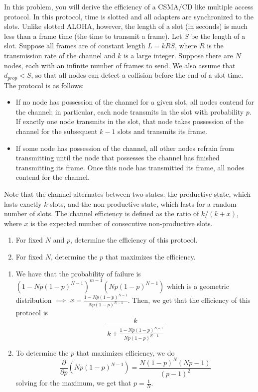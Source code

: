 \documentclass{report}
\begin{document}
\newpage
\begin{problem}
In this problem, you will derive the efficiency of a CSMA/CD like multiple access protocol.
In this protocol, time is slotted and all adapters are synchronized to the slots.
Unlike slotted ALOHA, however, the length of a slot (in seconds) is much less than a frame time (the time to transmit a frame).
Let $S$ be the length of a slot.
Suppose all frames are of constant length $L = kRS$, where $R$ is the transmission rate of the channel and $k$ is a large integer.
Suppose there are $N$ nodes, each with an infinite number of frames to send.
We also assume that $d_{prop} < S$, so that all nodes can detect a collision before the end of a slot time.
The protocol is as follows:

\begin{itemize}
\item If no node has possession of the channel for a given slot, all nodes contend for the channel; in particular, each node transmits in the slot with probability $p$. If exactly one node transmits in the slot, that node takes possession of the channel for the subsequent $k-1$ slots and transmits its frame.
\item If some node has possession of the channel, all other nodes refrain from transmitting until the node that possesses the channel has finished transmitting its frame. Once this node has transmitted its frame, all nodes contend for the channel.
\end{itemize}

Note that the channel alternates between two states: the productive state, which lasts exactly $k$ slots, and the non-productive state, which lasts for a random number of slots.
The channel efficiency is defined as the ratio of $k/(k+x)$, where $x$ is the expected number of consecutive non-productive slots.

\begin{enumerate}
\item For fixed $N$ and $p$, determine the efficiency of this protocol.
\item For fixed $N$, determine the $p$ that maximizes the efficiency.
\end{enumerate}

  \begin{answer}{60em}
      \begin{enumerate}
          \item We have that the probability of failure is $\left(1 - Np(1 - p)^{N - 1}\right)^{m - 1}(Np(1 - p)^{N - 1})$
              which is a geometric distribution $\implies$ $x = \frac{1 - Np(1 - p)^{N - 1}}{Np(1 - p)^{N - 1}}$. Then,
              we get that the efficiency of this protocol is 
              \[\frac{k}{k + \frac{1 - Np(1 - p)^{N - 1}}{Np(1 - p)^{N - 1}}}\]
          \item To determine the $p$ that maximizes efficiency, we do
              \[\frac{\partial}{\partial p} \left(Np(1 - p)^{N - 1}\right) = \frac{N(1 - p)^N(Np - 1)}{(p - 1)^2}\]
              solving for the maximum, we get that $p = \frac{1}{N}$.
      \end{enumerate}
  \end{answer}


\end{problem}
\end{document}
